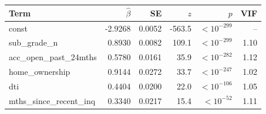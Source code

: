 \begin{tabular}{lrrrrr}
\toprule
Term & $\hat\beta$ & SE & $z$ & $p$ & VIF \\
\midrule
const & -2.9268 & 0.0052 & -563.5 & $<10^{-299}$ & -- \\
sub\_grade\_n & 0.8930 & 0.0082 & 109.1 & $<10^{-299}$ & 1.10 \\
acc\_open\_past\_24mths & 0.5780 & 0.0161 & 35.9 & $<10^{-282}$ & 1.12 \\
home\_ownership & 0.9144 & 0.0272 & 33.7 & $<10^{-247}$ & 1.02 \\
dti & 0.4404 & 0.0200 & 22.0 & $<10^{-106}$ & 1.05 \\
mths\_since\_recent\_inq & 0.3340 & 0.0217 & 15.4 & $<10^{-52}$ & 1.11 \\
\bottomrule
\end{tabular}
